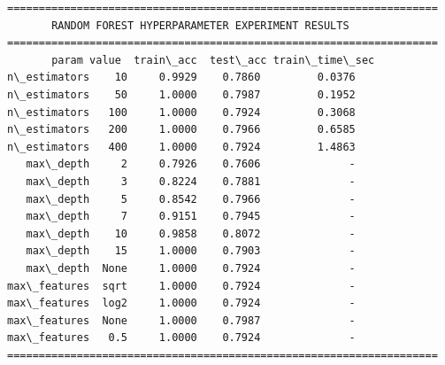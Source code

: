 \documentclass[11pt]{article}
\begin{document}
    \begin{Verbatim}[commandchars=\\\{\}]
====================================================================
       RANDOM FOREST HYPERPARAMETER EXPERIMENT RESULTS
====================================================================
       param value  train\_acc  test\_acc train\_time\_sec
n\_estimators    10     0.9929    0.7860         0.0376
n\_estimators    50     1.0000    0.7987         0.1952
n\_estimators   100     1.0000    0.7924         0.3068
n\_estimators   200     1.0000    0.7966         0.6585
n\_estimators   400     1.0000    0.7924         1.4863
   max\_depth     2     0.7926    0.7606              -
   max\_depth     3     0.8224    0.7881              -
   max\_depth     5     0.8542    0.7966              -
   max\_depth     7     0.9151    0.7945              -
   max\_depth    10     0.9858    0.8072              -
   max\_depth    15     1.0000    0.7903              -
   max\_depth  None     1.0000    0.7924              -
max\_features  sqrt     1.0000    0.7924              -
max\_features  log2     1.0000    0.7924              -
max\_features  None     1.0000    0.7987              -
max\_features   0.5     1.0000    0.7924              -
====================================================================
    \end{Verbatim}
\end{document}
